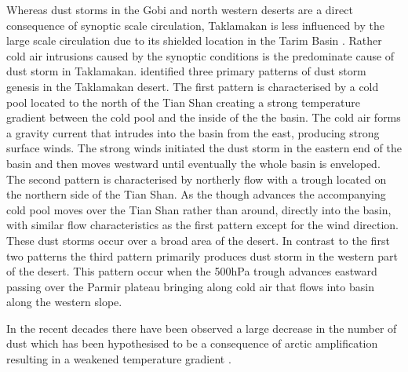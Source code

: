 Whereas dust storms in the Gobi and north western deserts are a direct consequence of synoptic scale circulation, Taklamakan is less influenced by the large scale circulation due to its shielded location in the Tarim Basin \parencite{takemi2005dust}.
Rather cold air intrusions caused by the synoptic conditions is the predominate cause of dust storm in Taklamakan. 
\textcite{aoki2005dust} identified three primary patterns of dust storm genesis in the Taklamakan desert. 
The first pattern is characterised by a cold pool located to the north of the Tian Shan creating a strong temperature gradient between the cold pool and the inside of the the basin. 
The cold air forms a gravity current that intrudes into the basin from the east, producing strong surface winds. 
The strong winds initiated the dust storm in the eastern end of the basin and then moves westward until eventually the whole basin is enveloped. 
The second pattern is characterised by northerly flow with a trough located on the northern side of the Tian Shan. 
As the though advances the accompanying cold pool moves over the Tian Shan rather than around, directly into the basin, with similar flow characteristics as the first pattern except for the wind direction. 
These dust storms occur over a broad area of the desert. In contrast to the first two patterns the third pattern primarily produces dust storm in the western part of the desert. This pattern occur when the 500hPa trough advances eastward passing over the Parmir plateau bringing along cold air that flows into basin along the western slope. 

In the recent decades there have been observed a large decrease in the number of dust  
which has been hypothesised to be a consequence of arctic amplification resulting in a weakened temperature gradient \parencite{liu2020impact}.


